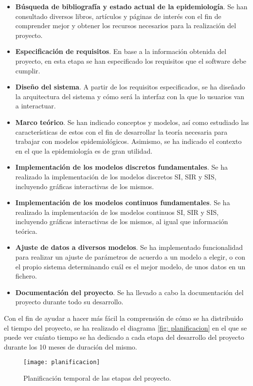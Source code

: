 \begin{itemize}
\item \textbf{Búsqueda de bibliografía y estado actual de la epidemiología}. Se han consultado diversos libros, artículos y páginas de interés con el fin de comprender mejor y obtener los recursos necesarios para la realización del proyecto.
\item \textbf{Especificación de requisitos}. En base a la información obtenida del proyecto, en esta etapa se han especificado los requisitos que el software debe cumplir.
\item \textbf{Diseño del sistema}. A partir de los requisitos especificados, se ha diseñado la arquitectura del sistema y cómo será la interfaz con la que lo usuarios van a interactuar.
\item \textbf{Marco teórico}. Se han indicado conceptos y modelos, así como estudiado las características de estos con el fin de desarrollar la teoría necesaria para trabajar con modelos epidemiológicos. Asimismo, se ha indicado el contexto en el que la epidemiología es de gran utilidad.
\item \textbf{Implementación de los modelos discretos fundamentales}. Se ha realizado la implementación de los modelos discretos SI, SIR y SIS, incluyendo gráficas interactivas de los mismos.
\item \textbf{Implementación de los modelos continuos fundamentales}. Se ha realizado la implementación de los modelos continuos SI, SIR y SIS, incluyendo gráficas interactivas de los mismos, al igual que información teórica.
\item \textbf{Ajuste de datos a diversos modelos}. Se ha implementado funcionalidad para realizar un ajuste de parámetros de acuerdo a un modelo a elegir, o con el propio sistema determinando cuál es el mejor modelo, de unos datos en un fichero.
\item \textbf{Documentación del proyecto}. Se ha llevado a cabo la documentación del proyecto durante todo su desarrollo.
\end{itemize}

Con el fin de ayudar a hacer más fácil la comprensión de cómo se ha distribuido el tiempo del proyecto, se ha realizado el diagrama \eqref{fig: planificacion} en el que se puede ver cuánto tiempo se ha dedicado a cada etapa del desarrollo del proyecto durante los 10 meses de duración del mismo.

\begin{figure}[!h]
\begin{center}
\caption{Planificación temporal de las etapas del proyecto.}
\label{fig: planificacion}
\texttt{[image: planificacion]}
\end{center}
\end{figure}


